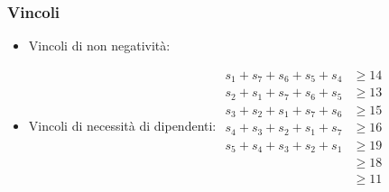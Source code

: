 \subsubsection{Vincoli}
\begin{itemize}
    \item Vincoli di non negatività: 

    \item Vincoli di necessità di dipendenti: 
    $
        \begin{aligned}
            s_1 + s_7 + s_6 + s_5 + s_4 &\geq 14 \\
            s_2 + s_1 + s_7 + s_6 + s_5 &\geq 13 \\
            s_3 + s_2 + s_1 + s_7 + s_6 &\geq 15 \\
            s_4 + s_3 + s_2 + s_1 + s_7 &\geq 16 \\
            s_5 + s_4 + s_3 + s_2 + s_1&\geq 19 \\
            &\geq 18 \\
            &\geq 11 
        \end{aligned}
    $
\end{itemize}
